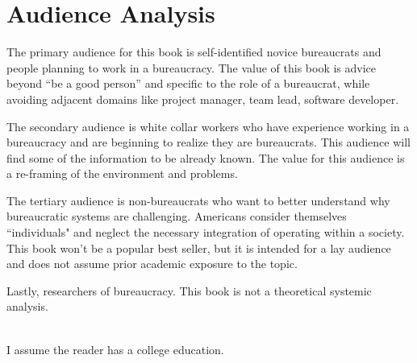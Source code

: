 \section{Audience Analysis}

The primary audience for this book is self-identified novice bureaucrats and people planning to work in a bureaucracy. The value of this book is advice beyond ``be a good person'' and specific to the role of a bureaucrat, while avoiding adjacent domains like project manager, team lead, software developer. 

The secondary audience is white collar workers who have experience working in a bureaucracy and are beginning to realize they are bureaucrats. This audience will find some of the information to be already known.  The value for this audience is a re-framing of the environment and problems. 

The tertiary audience is non-bureaucrats who want to better understand why bureaucratic systems are challenging. Americans consider themselves ``individuals" and neglect the necessary integration of operating within a society. This book won't be a popular best seller, but it is intended for a lay audience and does not assume prior academic exposure to the topic.

Lastly, researchers of bureaucracy. This book is not a theoretical systemic analysis. 

\ \\

I assume the reader has a college education. 


